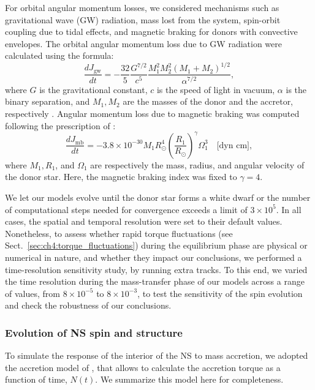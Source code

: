 \documentclass[main.tex]{subfiles}
\begin{document}
    For orbital angular momentum losses, we considered  mechanisms such as gravitational wave (GW) radiation, mass lost from the system, spin-orbit coupling due to tidal effects, and magnetic braking for donors with convective envelopes.
    The orbital angular momentum loss due to GW radiation were calculated using the formula: 
    \begin{equation}
        \label{eq:jdot_gw}
        \frac{dJ_{\text{gw}}}{dt} = - \frac{32}{5}\frac{G^{7/2}}{c^5}\frac{M_1^2 M_2^2 (M_1 + M_2)^{1/2}}{\alpha^{7/2}},
    \end{equation}
    where $G$ is the gravitational constant, $c$ is the speed of light in vacuum, $\alpha$ is the binary separation, and $M_1, M_2$ are the masses of the donor and the accretor, respectively \citep{Tauris:bk2006}.
    Angular momentum loss due to magnetic braking was computed following the prescription of \cite{Rappaport:apj1983}:
    \begin{equation}
        \label{eq:jdot_mb}
        \frac{dJ_{\text{mb}}}{dt} = -3.8 \times 10^{-30} M_1 R_\odot^4 \left(\frac{R_1}{R_\odot}\right)^{\gamma}\Omega_1^3\quad\text{[dyn cm]},
    \end{equation}
    where $M_1, R_1$, and $\Omega_1$ are respectively the mass, radius, and angular velocity of the donor star. Here, the magnetic braking index was fixed to  $\gamma = 4$.
    
    We let our models evolve until the donor star forms a white dwarf or the number of computational steps needed for convergence exceeds a limit of $3\times 10^5$. In all cases, the spatial and temporal resolution were set to their default values. Nonetheless, to assess whether rapid torque fluctuations (see Sect.~\ref{sec:ch4:torque_fluctuations}) during the equilibrium phase are physical or numerical in nature, and whether they impact our conclusions, we performed a time-resolution sensitivity study, by running extra \mesa tracks. To this end, we varied the time resolution during the mass-transfer phase of our models across a range of values, from $8\times10^{-5}$ to $8\times10^{-3}$, to test the sensitivity of the spin evolution and check the robustness of our conclusions.
    
    \subsubsection{Evolution of NS spin and structure}
    To simulate the response of the interior of the NS to mass accretion, we adopted
    the accretion model of \cite{Tauris:sc2012}, that allows to calculate the accretion torque as a function of time, $N(t)$. We summarize this model here for completeness.  
    
\end{document}
